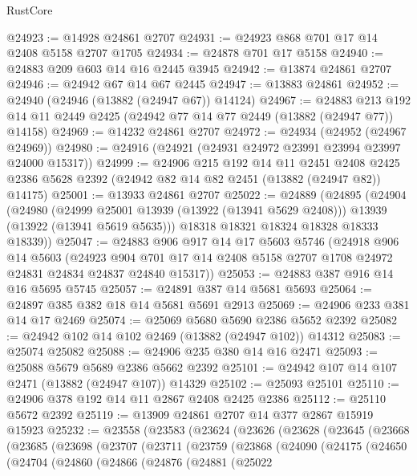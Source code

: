 \begin{lexlean}{RustCore}
\begin{coremodule}
@24923 := @14928 @24861 @2707
@24931 := @24923 @868 @701 @17 @14 @2408 @5158 @2707 @1705
@24934 := @24878 @701 @17 @5158
@24940 := @24883 @209 @603 @14 @16 @2445 @3945
@24942 := @13874 @24861 @2707
@24946 := @24942 @67 @14 @67 @2445
@24947 := @13883 @24861
@24952 := @24940 (@24946 (@13882 (@24947 @67)) @14124)
@24967 := @24883
    @213
    @192
    @14
    @11
    @2449
    @2425
    (@24942 @77 @14 @77 @2449 (@13882 (@24947 @77)) @14158)
@24969 := @14232 @24861 @2707
@24972 := @24934 (@24952 (@24967 @24969))
@24980 := @24916 (@24921 (@24931 @24972 @23991 @23994 @23997 @24000 @15317))
@24999 := @24906
    @215
    @192
    @14
    @11
    @2451
    @2408
    @2425
    @2386
    @5628
    @2392
    (@24942 @82 @14 @82 @2451 (@13882 (@24947 @82)) @14175)
@25001 := @13933 @24861 @2707
@25022 := @24889
    (@24895
      (@24904
        (@24980
          (@24999 @25001 @13939 (@13922 (@13941 @5629 @2408)))
          @13939
          (@13922 (@13941 @5619 @5635)))
        @18318
        @18321
        @18324
        @18328
        @18333
        @18339))
@25047 := @24883
    @906
    @917
    @14
    @17
    @5603
    @5746
    (@24918
      @906
      @14
      @5603
      (@24923 @904 @701 @17 @14 @2408 @5158 @2707 @1708 @24972 @24831 @24834 @24837 @24840 @15317))
@25053 := @24883 @387 @916 @14 @16 @5695 @5745
@25057 := @24891 @387 @14 @5681 @5693
@25064 := @24897 @385 @382 @18 @14 @5681 @5691 @2913
@25069 := @24906 @233 @381 @14 @17 @2469
@25074 := @25069 @5680 @5690 @2386 @5652 @2392
@25082 := @24942 @102 @14 @102 @2469 (@13882 (@24947 @102)) @14312
@25083 := @25074 @25082
@25088 := @24906 @235 @380 @14 @16 @2471
@25093 := @25088 @5679 @5689 @2386 @5662 @2392
@25101 := @24942 @107 @14 @107 @2471 (@13882 (@24947 @107)) @14329
@25102 := @25093 @25101
@25110 := @24906 @378 @192 @14 @11 @2867 @2408 @2425 @2386
@25112 := @25110 @5672 @2392
@25119 := @13909 @24861 @2707 @14 @377 @2867 @15919 @15923
@25232 := @23558
    (@23583
      (@23624
        (@23626
          (@23628
            (@23645
              (@23668
                (@23685
                  (@23698
                    (@23707
                      (@23711
                        (@23759
                          (@23868
                            (@24090
                              (@24175
                                (@24650
                                  (@24704
                                    (@24860
                                      (@24866
                                        (@24876
                                          (@24881
                                            (@25022

\end{coremodule}
\end{lexlean}
